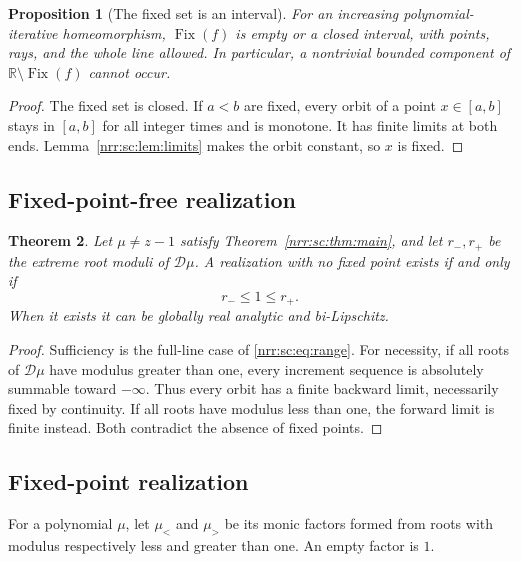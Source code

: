 \documentclass[11pt,letterpaper]{article}
\newtheorem{theorem}{Theorem}[section]
\newtheorem{proposition}[theorem]{Proposition}
\theoremstyle{definition}
\theoremstyle{remark}
\newcommand{\R}{\mathbb R}
\newcommand{\scD}{\mathcal D}
\DeclareMathOperator{\Fix}{Fix}
\begin{document}
\begin{proposition}[The fixed set is an interval]
\label{nrr:sc:prop:fixedinterval}
For an increasing polynomial-iterative homeomorphism, $\Fix(f)$ is
empty or a closed interval, with points, rays, and the whole line allowed.
In particular, a nontrivial bounded component of $\R\setminus\Fix(f)$
cannot occur.
\end{proposition}
\begin{proof}
The fixed set is closed. If $a<b$ are fixed, every orbit of a point
$x\in[a,b]$ stays in $[a,b]$ for all integer times and is monotone.
It has finite limits at both ends. Lemma~\ref{nrr:sc:lem:limits} makes the
orbit constant, so $x$ is fixed.
\end{proof}

\subsection{Fixed-point-free realization}

\begin{theorem}
\label{nrr:sc:thm:fixedfree}
Let $\mu\ne z-1$ satisfy Theorem~\ref{nrr:sc:thm:main}, and let $r_-,r_+$ be
the extreme root moduli of $\scD\mu$. A realization with no fixed point
exists if and only if
\begin{equation}
 r_-\le1\le r_+.
 \label{nrr:sc:eq:fixedfree}
\end{equation}
When it exists it can be globally real analytic and bi-Lipschitz.
\end{theorem}
\begin{proof}
Sufficiency is the full-line case of \eqref{nrr:sc:eq:range}.
For necessity, if all roots of $\scD\mu$ have modulus greater than one,
every increment sequence is absolutely summable toward $-\infty$.
Thus every orbit has a finite backward limit, necessarily fixed by
continuity. If all roots have modulus less than one, the forward limit
is finite instead. Both contradict the absence of fixed points.
\end{proof}

\subsection{Fixed-point realization}

For a polynomial $\mu$, let $\mu_{<}$ and $\mu_{>}$ be its monic factors
formed from roots with modulus respectively less and greater than one.
An empty factor is $1$.
\end{document}
